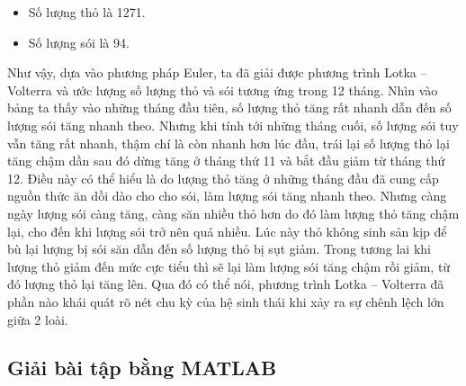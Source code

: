 \documentclass[a4paper,15pt]{article}
\begin{document}
\begin{itemize}
    \item Số lượng thỏ là 1271.
    \item Số lượng sói là 94.
\end{itemize}
Như vậy, dựa vào phương pháp Euler, ta đã giải được phương trình Lotka – 
Volterra và ước lượng số lượng thỏ và sói tương ứng trong 12 tháng. Nhìn vào bảng ta thấy vào những tháng đầu tiên, số lượng thỏ tăng rất nhanh dẫn đến số lượng sói tăng nhanh theo. Nhưng khi tính tới những tháng cuối, số lượng sói tuy vẫn tăng rất nhanh, thậm chí là còn nhanh hơn lúc đầu, trái lại số lượng thỏ lại tăng chậm dần sau đó dừng tăng ở tháng thứ 11 và bắt đầu giảm từ tháng thứ 12. Điều này có thể hiểu là do lượng thỏ tăng ở những tháng đầu đã cung cấp nguồn thức ăn dồi dào cho cho sói, làm lượng sói tăng nhanh theo. Nhưng càng ngày lượng sói càng tăng, càng săn nhiều thỏ hơn do đó làm lượng thỏ tăng chậm lại, cho đến khi lượng sói trở nên quá nhiều. Lúc này thỏ không sinh sản kịp để bù lại lượng bị sói săn dẫn đến số lượng thỏ bị sụt giảm. Trong 
tương lai khi lượng thỏ giảm đến mức cực tiểu thì sẽ lại làm lượng sói tăng chậm rồi giảm, từ đó lượng thỏ lại tăng lên. Qua đó có thể nói, phương trình Lotka – Volterra đã phần nào khái quát rõ nét chu kỳ của hệ sinh thái khi xảy ra sự chênh lệch lớn giữa 2 loài.
\subsection{Giải bài tập bằng MATLAB}
\end{document}
